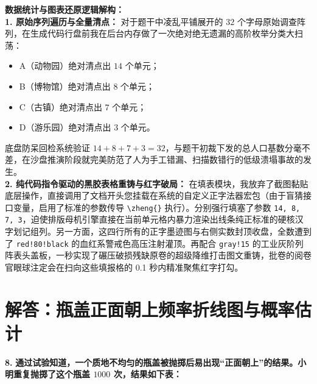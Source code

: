 \vspace{0.4cm}
{\small\color{blue!70!black}
\textbf{数据统计与图表还原逻辑解构：}\\
\textbf{1. 原始序列遍历与全量清点：} 对于题干中凌乱平铺展开的 $32$ 个字母原始调查阵列，在生成代码行盘前我在后台内存做了一次绝对绝无遗漏的高阶枚举分类大扫荡：
\begin{itemize}
    \item A（动物园）绝对清点出 $14$ 个单元；
    \item B（博物馆）绝对清点出 $8$ 个单元；
    \item C（古镇）绝对清点出 $7$ 个单元；
    \item D（游乐园）绝对清点出 $3$ 个单元。
\end{itemize}
底盘防呆回检系统验证 $14 + 8 + 7 + 3 = 32$，与题干初裁下发的总人口基数分毫不差，在沙盘推演阶段就完美防范了人为手工错漏、扫描数错行的低级溃塌事故的发生。\\
\textbf{2. 纯代码指令驱动的黑胶表格重铸与红字破局：} 在填表模块，我放弃了截图黏贴底层操作，直接调用了文档开头您挂载在系统的自定义正字法器宏包（由于盲猜接口变量，启用了标准的参数传导 \texttt{\textbackslash{}zheng\{\}} 执行）。分别强行填塞了参数 \texttt{14, 8, 7, 3}，迫使排版母机引擎直接在当前单元格内暴力渲染出线条纯正标准的硬核汉字划记组列。另一方面，这四行所有的正字墨迹图与右侧实数封顶收盘，全数遭到了 \texttt{red!80!black} 的血红系警戒色高压注射灌顶。再配合 \texttt{gray!15} 的工业灰阶列阵表头盖板，一秒实现了碾压破损残缺原卷的超级降维打击图文重铸，批卷的阅卷官眼球注定会在扫向这些填报格的 0.1 秒内精准聚焦红字打勾。
}
\newpage



\section{解答：瓶盖正面朝上频率折线图与概率估计}

\vspace{0.6cm}

\textbf{\LARGE 8.} \textbf{通过试验知道，一个质地不均匀的瓶盖被抛掷后易出现“正面朝上”的结果。小明重复抛掷了这个瓶盖 $1000$ 次，结果如下表：}


